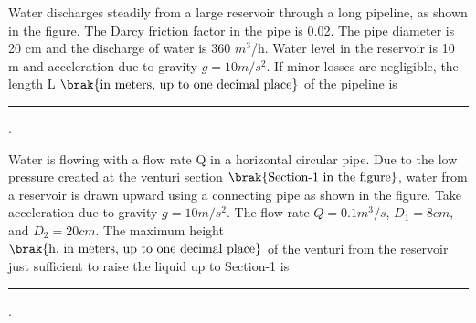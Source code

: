 \item Water discharges steadily from a large reservoir through a long pipeline, as shown in the figure. The Darcy friction factor in the pipe is 0.02. The pipe diameter is 20 cm and the discharge of water is 360 $m^3$/h. Water level in the reservoir is 10 m and acceleration due to gravity $g = 10 m/s^2$. If minor losses are negligible, the length L $\brak{\text{in meters, up to one decimal place}}$ of the pipeline is \rule{1cm}{0.4pt}.
	\begin{figure}[H]
		\centering
	\end{figure}
\item Water is flowing with a flow rate Q in a horizontal circular pipe. Due to the low pressure created at the venturi section $\brak{\text{Section-1 in the figure}}$, water from a reservoir is drawn upward using a connecting pipe as shown in the figure. Take acceleration due to gravity $g = 10 m/s^2$. The flow rate $Q = 0.1 m^3/s$, $D_1 = 8 cm$, and $D_2 = 20 cm$. The maximum height $\brak{\text{h, in meters, up to one decimal place}}$ of the venturi from the reservoir just sufficient to raise the liquid up to Section-1 is \rule{1cm}{0.4pt}.
